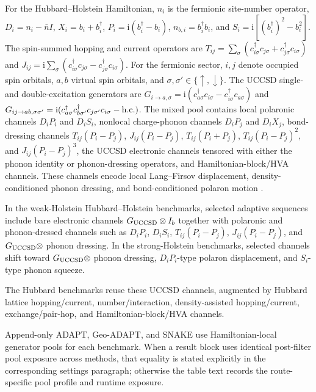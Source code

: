 \documentclass[
  reprint,
  amsmath,
  amssymb,
  aps,
  pra,
  nofootinbib,
  superscriptaddress,
  floatfix
]{revtex4-2}
\newcommand{\ii}{\mathrm{i}}
\begin{document}
For the Hubbard--Holstein Hamiltonian, \(n_i\) is the fermionic site-number
operator, \(D_i=n_i-\bar n I\), \(X_i=b_i+b_i^\dagger\),
\(P_i=\ii(b_i^\dagger-b_i)\), \(n_{b,i}=b_i^\dagger b_i\), and
\(S_i=\ii[(b_i^\dagger)^2-b_i^2]\).  The spin-summed hopping and current
operators are \(T_{ij}=\sum_\sigma(c_{i\sigma}^\dagger c_{j\sigma}
+c_{j\sigma}^\dagger c_{i\sigma})\) and
\(J_{ij}=\ii\sum_\sigma(c_{i\sigma}^\dagger c_{j\sigma}
-c_{j\sigma}^\dagger c_{i\sigma})\).  For the fermionic sector, \(i,j\)
denote occupied spin orbitals, \(a,b\) virtual spin orbitals, and
\(\sigma,\sigma'\in\{\uparrow,\downarrow\}\).  The UCCSD single- and
double-excitation generators are
\(G_{i\to a,\sigma}=\ii(c_{a\sigma}^{\dagger}c_{i\sigma}
-c_{i\sigma}^{\dagger}c_{a\sigma})\) and
\(G_{ij\to ab,\sigma\sigma'}=\ii(c_{a\sigma}^{\dagger}
c_{b\sigma'}^{\dagger}c_{j\sigma'}c_{i\sigma}-{\rm h.c.})\).  The mixed pool contains local
polaronic channels \(D_iP_i\) and \(D_iS_i\), nonlocal charge-phonon channels
\(D_iP_j\) and \(D_iX_j\), bond-dressing channels \(T_{ij}(P_i-P_j)\),
\(J_{ij}(P_i-P_j)\), \(T_{ij}(P_i+P_j)\), \(T_{ij}(P_i-P_j)^2\), and
\(J_{ij}(P_i-P_j)^3\), the UCCSD electronic channels tensored with either the phonon identity
or phonon-dressing operators, and Hamiltonian-block/HVA channels.  These
channels encode local Lang--Firsov displacement, density-conditioned phonon
dressing, and bond-conditioned polaron motion
\cite{Holstein1959a,Holstein1959b,Sakkinen2015HolsteinDimer}.

In the weak-Holstein Hubbard--Holstein benchmarks, selected adaptive sequences
include bare electronic channels \(G_{\rm UCCSD}\otimes I_b\) together with
polaronic and phonon-dressed channels such as \(D_iP_i\), \(D_iS_i\),
\(T_{ij}(P_i-P_j)\), \(J_{ij}(P_i-P_j)\), and
\(G_{\rm UCCSD}\otimes\) phonon dressing.  In the strong-Holstein benchmarks,
selected channels shift toward \(G_{\rm UCCSD}\otimes\) phonon dressing,
\(D_iP_i\)-type polaron displacement, and \(S_i\)-type phonon squeeze.

The Hubbard benchmarks reuse these UCCSD channels, augmented by Hubbard
lattice hopping/current, number/interaction, density-assisted hopping/current,
exchange/pair-hop, and Hamiltonian-block/HVA channels.

Append-only ADAPT, Geo-ADAPT, and SNAKE use Hamiltonian-local generator pools
for each benchmark. When a result block uses identical post-filter pool
exposure across methods, that equality is stated explicitly in the corresponding
settings paragraph; otherwise the table text records the route-specific pool
profile and runtime exposure.
\end{document}
